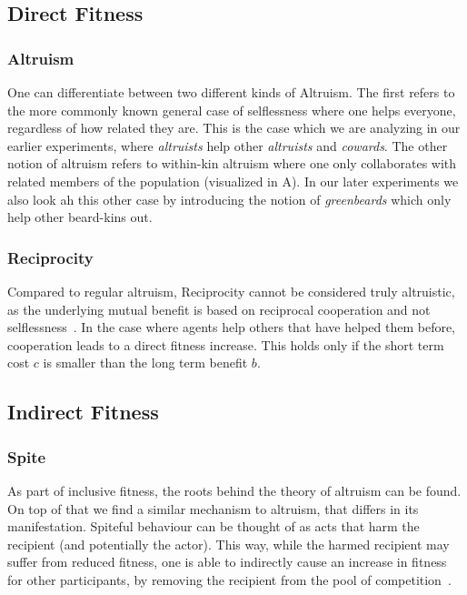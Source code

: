 \documentclass[sigconf]{acmart}
\newcommand{\todo}[1]{{\color{red}{#1}}}
\newcommand{\cowards}{\textit{cowards}\xspace}
\newcommand{\altruists}{\textit{altruists}\xspace}
\newcommand{\greenbeards}{\textit{greenbeards}\xspace}
\begin{document}
    \subsection{Direct Fitness}\label{subsec:direct_fit}

    \subsubsection{Altruism}
    One can differentiate between two different kinds of Altruism.   %
    The first refers to the more commonly known general case of selflessness where one helps everyone, regardless of how related they are.
    This is the case which we are analyzing in our earlier experiments, where \altruists help other \altruists and \cowards.
    The other notion of altruism refers to within-kin altruism where one only collaborates with related members of the population (visualized in  A).
    In our later experiments we also look ah this other case by introducing the notion of \greenbeards which only help other beard-kins \todo{really kins?} out.

    \subsubsection{Reciprocity}\label{reciprocity}
    Compared to regular altruism, Reciprocity cannot be considered truly altruistic, as the underlying mutual benefit is based on reciprocal cooperation and not selflessness~\cite{triversEvolutionReciprocalAltruism1971}.
    In the case where agents help others that have helped them before, cooperation leads to a direct fitness increase.
    This holds only if the short term cost $c$ is smaller than the long term benefit $b$.

    \subsection{Indirect Fitness}\label{indirect_fit}

    \subsubsection{Spite}
    As part of inclusive fitness, the roots behind the theory of altruism can be found.
    On top of that we find a similar mechanism to altruism, that differs in its manifestation.
    Spiteful behaviour can be thought of as acts that harm the recipient (and potentially the actor).
    This way, while the harmed recipient may suffer from reduced fitness, one is able to indirectly cause an increase in fitness for other participants, by removing the recipient from the pool of competition~\cite{hamiltonSelfishSpitefulBehaviour1970}.
\end{document}
